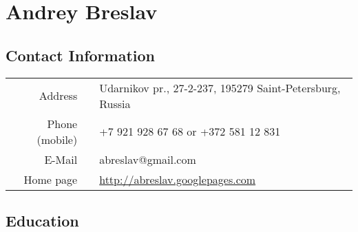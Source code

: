 \documentclass[a4paper, 12pt]{article}
\begin{document}
\section*{Andrey Breslav}

\subsection*{Contact Information}
\begin{tabular}{rll}
	Address &\hspace{10pt}& Udarnikov pr., 27-2-237, 195279 Saint-Petersburg, Russia\\
	Phone (mobile) && +7 921 928 67 68 or +372 581 12 831\\
	E-Mail && abreslav@gmail.com \\
	Home page && \url{http://abreslav.googlepages.com}\\
\end{tabular}

\subsection*{Education}
\end{document}
